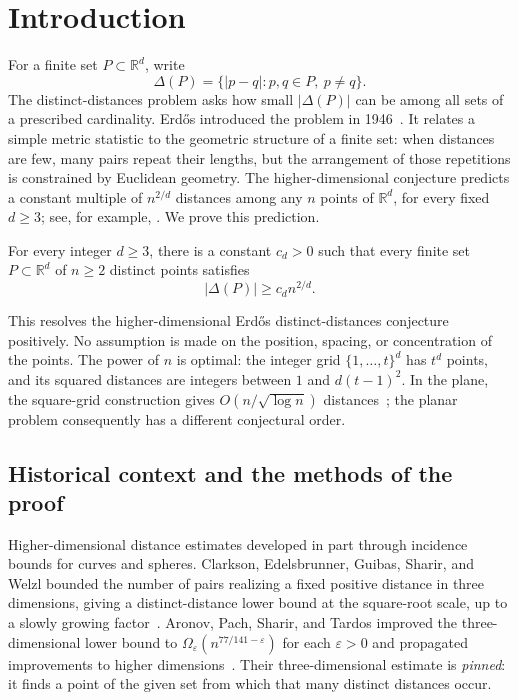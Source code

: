 \section{Introduction}\label{sec:introduction}

For a finite set \(P\subset\mathbb R^d\), write
\[
 \Delta(P)=\{|p-q|:p,q\in P,\ p\ne q\}.
\]
The distinct-distances problem asks how small \(|\Delta(P)|\) can be
among all sets of a prescribed cardinality. Erd\H{o}s introduced the
problem in 1946~\cite{erdos1946}. It relates a simple metric statistic
to the geometric structure of a finite set: when distances are few,
many pairs repeat their lengths, but the arrangement of those repetitions is
constrained by Euclidean geometry.
The higher-dimensional conjecture predicts a constant multiple of
\(n^{2/d}\) distances among any \(n\) points of \(\mathbb R^d\), for
every fixed \(d\ge3\); see, for example,
\cite{BardwellEvansSheffer2019,tidoryuzakharov2026}.
We prove this prediction.

\begin{theorem}\label{thm:main}
For every integer \(d\ge3\), there is a constant \(c_d>0\) such that
every finite set \(P\subset\mathbb R^d\) of \(n\ge2\) distinct points
satisfies
\[
 |\Delta(P)|\ge c_d n^{2/d}.
\]
\end{theorem}

This resolves the higher-dimensional Erd\H{o}s distinct-distances
conjecture positively. No assumption is made on the position, spacing,
or concentration of the points. The power of \(n\) is optimal:
the integer grid \(\{1,\ldots,t\}^d\) has \(t^d\) points, and its squared
distances are integers between \(1\) and \(d(t-1)^2\). In the plane,
the square-grid construction gives \(O(n/\sqrt{\log n})\)
distances~\cite{erdos1946}; the planar problem consequently
has a different conjectural order.

\subsection{Historical context and the methods of the proof}

Higher-dimensional distance estimates developed in part through
incidence bounds for curves and spheres. Clarkson, Edelsbrunner,
Guibas, Sharir, and Welzl bounded the number of pairs realizing a fixed
positive distance in three dimensions, giving a distinct-distance
lower bound at the square-root scale, up to a slowly growing
factor~\cite{ClarksonEdelsbrunnerGuibasSharirWelzl1990}.
Aronov, Pach, Sharir, and Tardos improved the three-dimensional lower
bound to \(\Omega_\varepsilon(n^{77/141-\varepsilon})\) for each
\(\varepsilon>0\) and propagated improvements to higher
dimensions~\cite{AronovPachSharirTardos2004}.
Their three-dimensional estimate is \emph{pinned}: it finds a point
of the given set from which that many distinct distances occur.

